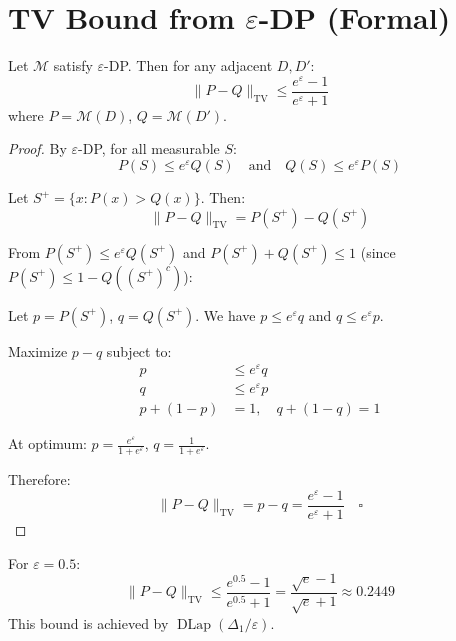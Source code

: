 \section{TV Bound from $\varepsilon$-DP (Formal)}

\begin{lemma}
\label{lem:tv}
Let $\mathcal{M}$ satisfy $\varepsilon$-DP.
Then for any adjacent $D, D'$:
\[
\|P - Q\|_{\mathrm{TV}}
\leq \frac{e^\varepsilon - 1}{e^\varepsilon + 1}
\]
where $P = \mathcal{M}(D)$, $Q = \mathcal{M}(D')$.
\end{lemma}

\begin{proof}
By $\varepsilon$-DP, for all measurable $S$:
\[
P(S) \leq e^\varepsilon Q(S)
\quad \text{and} \quad
Q(S) \leq e^\varepsilon P(S)
\]

Let $S^+ = \{x : P(x) > Q(x)\}$.
Then:
\[
\|P - Q\|_{\mathrm{TV}}
= P(S^+) - Q(S^+)
\]

From $P(S^+) \leq e^\varepsilon Q(S^+)$
and $P(S^+) + Q(S^+) \leq 1$
(since $P(S^+) \leq 1 - Q((S^+)^c)$):

Let $p = P(S^+)$, $q = Q(S^+)$.
We have $p \leq e^\varepsilon q$
and $q \leq e^\varepsilon p$.

Maximize $p - q$ subject to:
\begin{align}
p &\leq e^\varepsilon q \\
q &\leq e^\varepsilon p \\
p + (1-p) &= 1, \quad q + (1-q) = 1
\end{align}

At optimum: $p = \frac{e^\varepsilon}{1+e^\varepsilon}$,
$q = \frac{1}{1+e^\varepsilon}$.

Therefore:
\[
\|P - Q\|_{\mathrm{TV}}
= p - q
= \frac{e^\varepsilon - 1}{e^\varepsilon + 1}
\quad \square
\]
\end{proof}

\begin{corollary}[Tight TV for $\varepsilon=0.5$]
For $\varepsilon = 0.5$:
\[
\|P - Q\|_{\mathrm{TV}}
\leq \frac{e^{0.5}-1}{e^{0.5}+1}
= \frac{\sqrt{e}-1}{\sqrt{e}+1}
\approx 0.2449
\]
This bound is achieved by
$\operatorname{DLap}(\Delta_1/\varepsilon)$.
\end{corollary}

